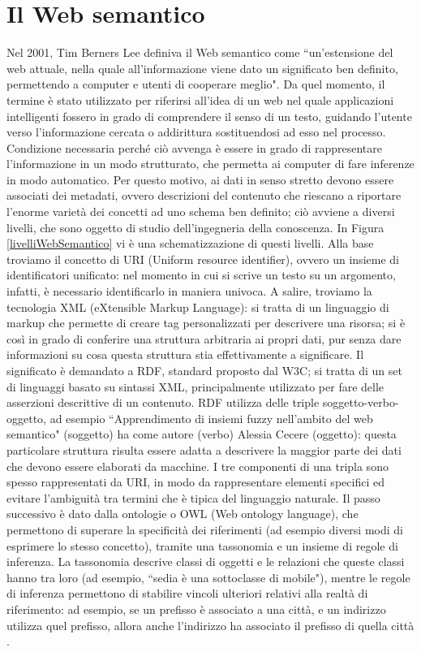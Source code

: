 \documentclass[12pt,a4paper]{report}
\begin{document}
\section{Il Web semantico}
Nel 2001, Tim Berners Lee definiva il Web semantico come ``un'estensione del web attuale, nella quale all'informazione viene dato un significato ben definito, permettendo a computer e utenti di cooperare meglio"\cite{semanticWebPaper}.
Da quel momento, il termine è stato utilizzato per riferirsi all'idea di un web nel quale applicazioni intelligenti fossero in grado di comprendere il senso di un testo, guidando l'utente verso l'informazione cercata o addirittura sostituendosi ad esso nel processo.
Condizione necessaria perché ciò avvenga è essere in grado di rappresentare l'informazione in un modo strutturato, che permetta ai computer di fare inferenze in modo automatico. Per questo motivo, ai dati in senso stretto devono essere associati dei metadati, ovvero descrizioni del contenuto che riescano a riportare l'enorme varietà dei concetti ad uno schema ben definito; ciò avviene a diversi livelli, che sono oggetto di studio dell'ingegneria della conoscenza. In Figura \ref{livelliWebSemantico} vi è una schematizzazione di questi livelli. 
Alla base troviamo il concetto di URI (Uniform resource identifier), ovvero un insieme di identificatori unificato: nel momento in cui si scrive un testo su un argomento, infatti, è necessario identificarlo in maniera univoca.
A salire, troviamo la tecnologia XML (eXtensible Markup Language): si tratta di un linguaggio di markup che permette di creare tag personalizzati per descrivere una risorsa; si è così in grado di conferire una struttura arbitraria ai propri dati, pur senza dare informazioni su cosa questa struttura stia effettivamente a significare.
Il significato è demandato a RDF, standard proposto dal W3C; si tratta di un set di linguaggi basato su sintassi XML, principalmente utilizzato per fare delle asserzioni descrittive di un contenuto. RDF utilizza delle triple soggetto-verbo-oggetto, ad esempio ``Apprendimento di insiemi fuzzy nell'ambito del web semantico" (soggetto) ha come autore (verbo) Alessia Cecere (oggetto): questa particolare struttura risulta essere adatta a descrivere la maggior parte dei dati che devono essere elaborati da macchine.
I tre componenti di una tripla sono spesso rappresentati da URI, in modo da rappresentare elementi specifici ed evitare l'ambiguità tra termini che è tipica del linguaggio naturale.
Il passo successivo è dato dalla ontologie o OWL (Web ontology language), che permettono di superare la specificità dei riferimenti (ad esempio diversi modi di esprimere lo stesso concetto), tramite una tassonomia e un insieme di regole di inferenza. La tassonomia descrive classi di oggetti e le relazioni che queste classi hanno tra loro (ad esempio, ``sedia è una sottoclasse di mobile"), mentre le regole di inferenza permettono di stabilire vincoli ulteriori relativi alla realtà di riferimento: ad esempio, se un prefisso è associato a una città, e un indirizzo utilizza quel prefisso, allora anche l'indirizzo ha associato il prefisso di quella città \cite{semanticWebPaper}. 
\end{document}

